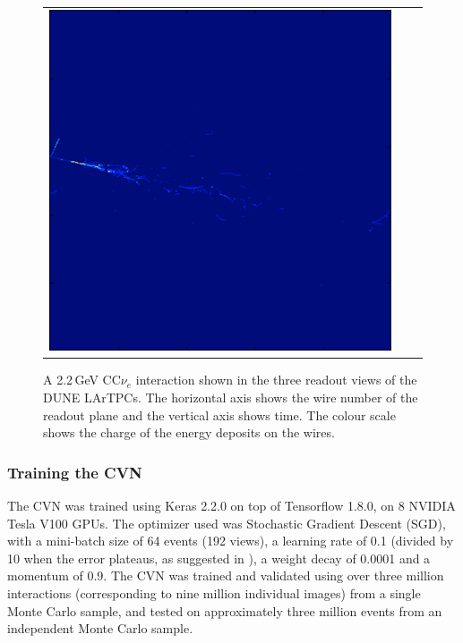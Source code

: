 \begin{figure}[htb]
\begin{tabular}{ccc}
    \includegraphics[scale=0.23]{graphics/cvn_nue_view2.png}
	\end{tabular}
	\caption{A 2.2\,GeV CC$\nu_e$ interaction shown in the three readout views of the DUNE LArTPCs. The horizontal axis shows the wire number of the readout plane and the vertical axis shows time. The colour scale shows the charge of the energy deposits on the wires.}
	\label{fig:cvn_views}
\end{figure}

\subsubsection{Training the CVN}
\label{sec:cvn:training}
The CVN was trained using Keras \cite{Chollet-et-al-2015-keras} 2.2.0 on top of Tensorflow \cite{Abadi-et-al-2016-tensorflow} 1.8.0, on 8 NVIDIA Tesla V100 GPUs. The optimizer used was Stochastic Gradient Descent (SGD), with a mini-batch size of 64 events (192 views), a learning rate of 0.1 (divided by 10 when the error plateaus, as suggested in \cite{He-et-al-2015-deep}), a weight decay of 0.0001 and a momentum of 0.9. The CVN was trained and validated using over three million interactions (corresponding to nine million individual images) from a single Monte Carlo sample, and tested on approximately three million events from an independent Monte Carlo sample.

